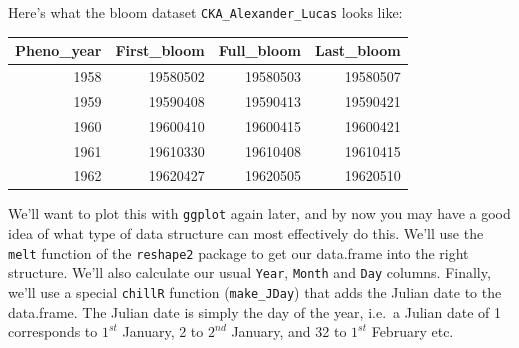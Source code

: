 \documentclass[
]{book}
\newenvironment{Shaded}{\begin{snugshade}}{\end{snugshade}}
\newcommand{\DataTypeTok}[1]{\textcolor[rgb]{0.13,0.29,0.53}{#1}}
\newcommand{\DecValTok}[1]{\textcolor[rgb]{0.00,0.00,0.81}{#1}}
\newcommand{\KeywordTok}[1]{\textcolor[rgb]{0.13,0.29,0.53}{\textbf{#1}}}
\newcommand{\NormalTok}[1]{#1}
\newcommand{\OperatorTok}[1]{\textcolor[rgb]{0.81,0.36,0.00}{\textbf{#1}}}
\newcommand{\StringTok}[1]{\textcolor[rgb]{0.31,0.60,0.02}{#1}}
\begin{document}
Here's what the bloom dataset \texttt{CKA\_Alexander\_Lucas} looks like:

\begin{Shaded}
\end{Shaded}

\begingroup\fontsize{10}{12}\selectfont

\begin{tabular}{r|r|r|r}
\hline
Pheno\_year & First\_bloom & Full\_bloom & Last\_bloom\\
\hline
1958 & 19580502 & 19580503 & 19580507\\
\hline
1959 & 19590408 & 19590413 & 19590421\\
\hline
1960 & 19600410 & 19600415 & 19600421\\
\hline
1961 & 19610330 & 19610408 & 19610415\\
\hline
1962 & 19620427 & 19620505 & 19620510\\
\hline
\end{tabular}
\endgroup{}

We'll want to plot this with \texttt{ggplot} again later, and by now you may have a good idea of what type of data structure can most effectively do this. We'll use the \texttt{melt} function of the \texttt{reshape2} package to get our data.frame into the right structure. We'll also calculate our usual \texttt{Year}, \texttt{Month} and \texttt{Day} columns. Finally, we'll use a special \texttt{chillR} function (\texttt{make\_JDay}) that adds the Julian date to the data.frame. The Julian date is simply the day of the year, i.e.~a Julian date of 1 corresponds to \(1^{st}\) January, 2 to \(2^{nd}\) January, and 32 to \(1^{st}\) February etc.
\end{document}
